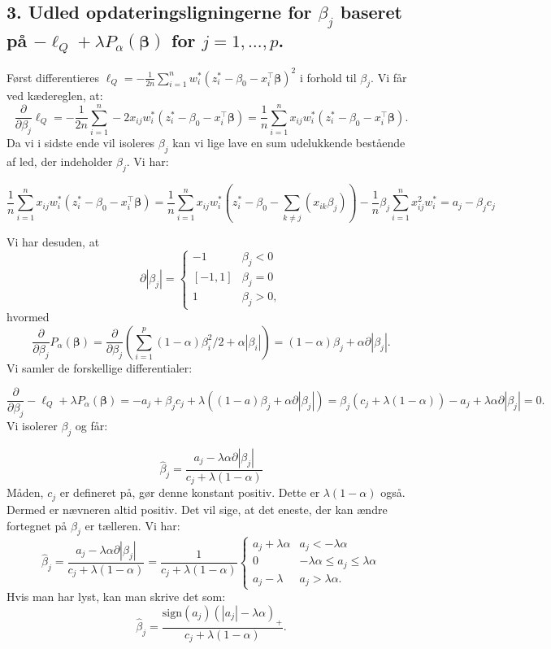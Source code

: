 \documentclass[12pt]{report}
\theoremstyle{break}
\theoremstyle{break}
\newcommand{\bbeta}{\bm{\beta}}
\newcommand{\pdif}[1]{\frac{\partial}{\partial #1}}
\begin{document}
\subsection*{3. Udled opdateringsligningerne for $\beta_j$ baseret på $-\ell_Q+\lambda P_\alpha(\bbeta)$ for $j=1,\ldots,p$.}
Først differentieres $\ell_Q = -\frac{1}{2n}\sum_{i=1}^{n}w_i^\ast(z_i^\ast-\beta_0-x_i^\top\bbeta)^2$ i forhold til $\beta_j$. Vi får ved kædereglen, at:
\[\pdif{\beta_j}\ell_Q = -\frac{1}{2n}\sum_{i=1}^{n}-2x_{ij}w_i^\ast(z_i^\ast-\beta_0-x_i^\top\bbeta) = \frac{1}{n}\sum_{i=1}^{n}x_{ij}w_i^\ast(z_i^\ast-\beta_0-x_i^\top\bbeta).\]
Da vi i sidste ende vil isoleres $\beta_j$ kan vi lige lave en sum udelukkende bestående af led, der indeholder $\beta_j$. Vi har:

\[\frac{1}{n}\sum_{i=1}^{n}x_{ij}w_i^\ast(z_i^\ast-\beta_0-x_i^\top\bbeta) = \frac{1}{n}\sum_{i=1}^{n}x_{ij}w_i^\ast(z_i^\ast-\beta_0-\sum_{k\neq j}(x_{ik}\beta_j))-\frac{1}{n}\beta_j\sum_{i=1}^{n}x_{ij}^2w_i^\ast = a_j-\beta_jc_j\]

Vi har desuden, at
\begin{equation*}
\partial|\beta_j| =
\begin{cases}
-1 & \beta_j < 0\\
[-1,1] & \beta_j = 0\\
1 & \beta_j > 0,
\end{cases}       
\end{equation*}
hvormed
\[\pdif{\beta_j}P_\alpha(\bbeta) = \pdif{\beta_j}\left(\sum_{i=1}^{p}(1-\alpha)\beta_i^2/2+\alpha|\beta_i|\right) = (1-\alpha)\beta_j+\alpha\partial|\beta_j|.\]
Vi samler de forskellige differentialer:

\[\pdif{\beta_j}-\ell_Q+\lambda P_\alpha(\bbeta) = -a_j+\beta_jc_j+\lambda((1-a)\beta_j+\alpha\partial|\beta_j|) = \beta_j(c_j+\lambda(1-\alpha))-a_j+\lambda\alpha\partial|\beta_j|=0.\]
Vi isolerer $\beta_j$ og får:

\begin{equation*}
\widehat{\beta}_j = \frac{a_j-\lambda\alpha\partial|\beta_j|}{c_j+\lambda(1-\alpha)}
\end{equation*}
Måden, $c_j$ er defineret på, gør denne konstant positiv. Dette er $\lambda(1-\alpha)$ også. Dermed er nævneren altid positiv. Det vil sige, at det eneste, der kan ændre fortegnet på $\beta_j$ er tælleren. Vi har:
\begin{equation*}
\widehat{\beta}_j = \frac{a_j-\lambda\alpha\partial|\beta_j|}{c_j+\lambda(1-\alpha)} = \frac{1}{c_j+\lambda(1-\alpha)}\begin{cases}
a_j+\lambda\alpha & a_j<-\lambda\alpha\\
0 & -\lambda\alpha\leq a_j\leq \lambda\alpha \\
a_j-\lambda & a_j > \lambda\alpha.
\end{cases}
\end{equation*}
Hvis man har lyst, kan man skrive det som:
\[\widehat{\beta}_j = \frac{\text{sign}(a_j)(|a_j|-\lambda\alpha)_+}{c_j+\lambda(1-\alpha)}.\]
\end{document}
